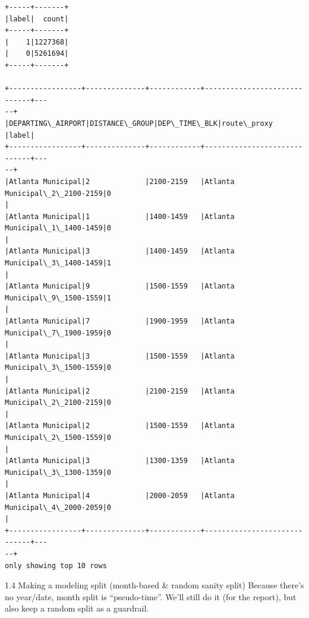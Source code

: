 \documentclass[11pt]{article}
\begin{document}
    \begin{Verbatim}[commandchars=\\\{\}]
+-----+-------+
|label|  count|
+-----+-------+
|    1|1227368|
|    0|5261694|
+-----+-------+

+-----------------+--------------+------------+-----------------------------+---
--+
|DEPARTING\_AIRPORT|DISTANCE\_GROUP|DEP\_TIME\_BLK|route\_proxy
|label|
+-----------------+--------------+------------+-----------------------------+---
--+
|Atlanta Municipal|2             |2100-2159   |Atlanta Municipal\_2\_2100-2159|0
|
|Atlanta Municipal|1             |1400-1459   |Atlanta Municipal\_1\_1400-1459|0
|
|Atlanta Municipal|3             |1400-1459   |Atlanta Municipal\_3\_1400-1459|1
|
|Atlanta Municipal|9             |1500-1559   |Atlanta Municipal\_9\_1500-1559|1
|
|Atlanta Municipal|7             |1900-1959   |Atlanta Municipal\_7\_1900-1959|0
|
|Atlanta Municipal|3             |1500-1559   |Atlanta Municipal\_3\_1500-1559|0
|
|Atlanta Municipal|2             |2100-2159   |Atlanta Municipal\_2\_2100-2159|0
|
|Atlanta Municipal|2             |1500-1559   |Atlanta Municipal\_2\_1500-1559|0
|
|Atlanta Municipal|3             |1300-1359   |Atlanta Municipal\_3\_1300-1359|0
|
|Atlanta Municipal|4             |2000-2059   |Atlanta Municipal\_4\_2000-2059|0
|
+-----------------+--------------+------------+-----------------------------+---
--+
only showing top 10 rows

    \end{Verbatim}

    1.4 Making a modeling split (month-based \& random sanity split) Because
there's no year/date, month split is ``pseudo-time''. We'll still do it
(for the report), but also keep a random split as a guardrail.
\end{document}
